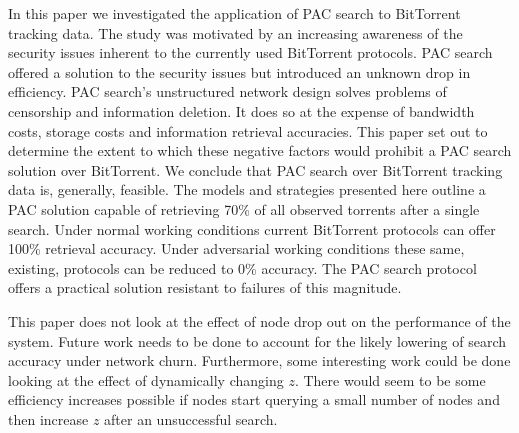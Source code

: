 In this paper we investigated the application of PAC search to BitTorrent tracking data. The study was motivated by an increasing awareness of the security issues inherent to the currently used BitTorrent protocols. PAC search offered a solution to the security issues but introduced an unknown drop in efficiency. PAC search's unstructured network design solves problems of censorship and information deletion. It does so at the expense of bandwidth costs, storage costs and information retrieval accuracies. This paper set out to determine the extent to which these negative factors would prohibit a PAC search solution over BitTorrent. We conclude that PAC search over BitTorrent tracking data is, generally, feasible. The models and strategies presented here outline a PAC solution capable of retrieving 70\% of all observed torrents after a single search. Under normal working conditions current BitTorrent protocols can offer 100\% retrieval accuracy. Under adversarial working conditions these same, existing, protocols can be reduced to 0\% accuracy. The PAC search protocol offers a practical solution resistant to failures of this magnitude.

This paper does not look at the effect of node drop out on the performance of the system. Future work needs to be done to account for the likely lowering of search accuracy under network churn. Furthermore, some interesting work could be done looking at the effect of dynamically changing $z$. There would seem to be some efficiency increases possible if nodes start querying a small number of nodes and then increase $z$ after an unsuccessful search.